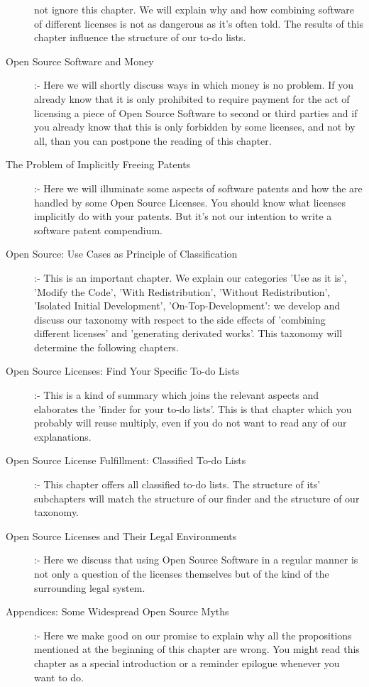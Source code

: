 \begin{description}
  not ignore this chapter. We will explain why and how combining software
  of different licenses is not as dangerous as it's often told. The results of
  this chapter influence the structure of our to-do lists.
  \item[Open Source Software and Money] :- Here we will shortly
  discuss ways in which money is no problem. If you already know that it is only
  prohibited to require payment for the act of licensing a piece of Open Source
  Software to second or third parties and if you already know that this is only
  forbidden by some licenses, and not by all, than you can postpone the reading
  of this chapter.
  \item[The Problem of Implicitly Freeing Patents] :- Here we
  will illuminate some aspects of software patents and how the are handled by
  some Open Source Licenses. You should know what licenses implicitly do with
  your patents. But it's not our intention to write a software patent
  compendium.
  \item[Open Source: Use Cases as Principle of Classification] :- This is an
  important chapter. We explain our categories 'Use as it is', 'Modify the
  Code', 'With Redistribution', 'Without Redistribution', 'Isolated Initial
  Development', 'On-Top-Development': we develop and discuss our taxonomy with
  respect to the side effects of 'combining different licenses' and 'generating
  derivated works'. This taxonomy will determine the following chapters.
  \item[Open Source Licenses: Find Your Specific To-do Lists] :- This is a kind
  of summary which joins the relevant aspects and elaborates the 'finder
  for your to-do lists'. This is that chapter which you probably will reuse
  multiply, even if you do not want to read any of our explanations.
  \item[Open Source License Fulfillment: Classified To-do Lists] :- This chapter
  offers all classified to-do lists. The structure of its' subchapters will
  match the structure of our finder and the structure of our taxonomy.
  \item[Open Source Licenses and Their Legal Environments] :- Here we discuss
  that using Open Source Software in a regular manner is not only a question of
  the licenses themselves but of the kind of the surrounding legal system.
  \item[Appendices: Some Widespread Open Source Myths] :- Here we make good on
  our promise to explain why all the propositions mentioned at the beginning of
  this chapter are wrong. You might read this chapter as a special introduction
  or a reminder epilogue whenever you want to do.
\end{description}


%
